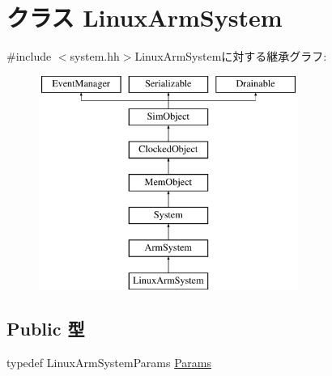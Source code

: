 \hypertarget{classLinuxArmSystem}{
\section{クラス LinuxArmSystem}
\label{classLinuxArmSystem}
}


{\ttfamily \#include $<$system.hh$>$}LinuxArmSystemに対する継承グラフ:\begin{figure}[H]
\begin{center}
\leavevmode
\includegraphics[height=7cm]{classLinuxArmSystem}
\end{center}
\end{figure}
\subsection*{Public 型}
\begin{DoxyCompactItemize}
\item 
typedef LinuxArmSystemParams \hyperlink{classLinuxArmSystem_ae0ebf28024a7bb607cc65e59c8faa9d5}{Params}
\end{DoxyCompactItemize}
